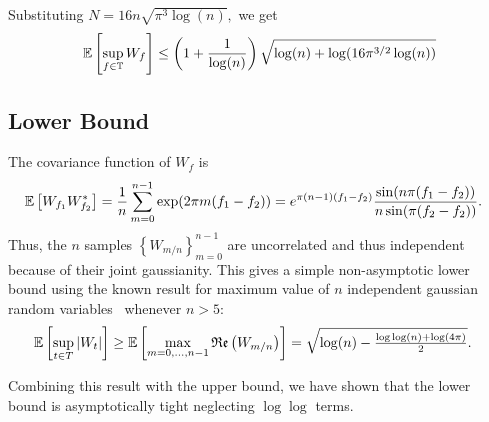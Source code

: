 Substituting $N = 16 n \sqrt{\pi^3 \log(n)},$ we get
\[
	\operatorname{\mathbb{E}}\left[\sup_{f \in \mathbb{T}} W_f \right] \leq \left( 1 + \frac{1}{\log(n)} \right)\sqrt{\log(n) + \log(16 \pi^{3/2} \log(n))}
\]
\subsection{Lower Bound}

The covariance function of $W_f$ is
\begin{align*}
\operatorname{\mathbb{E}}\left[W_{f_1} W_{f_2}^*\right] &= \frac{1}{n}\sum_{m=0}^{n-1} \exp(2\pi m (f_1 - f_2)) = e^{\pi (n - 1) (f_1-f_2)} \frac{\sin(n \pi (f_1 - f_2) ) }{ n \sin(\pi (f_2 - f_2))}.
\end{align*}
Thus, the $n$ samples $\left\{W_{m/n}\right\}_{m=0}^{n-1}$ are uncorrelated and thus independent because of their joint gaussianity. This gives a simple non-asymptotic lower bound using the known result for maximum value of $n$ independent gaussian random variables~\cite{lr76} whenever $n > 5$:
\begin{align*}
\operatorname{\mathbb{E}}\left[\sup_{t \in T} \left| W_t \right| \right] &\geq \operatorname{\mathbb{E}}\left[\max_{m = 0, \ldots, n-1} \mathop{\mathfrak{Re}}\left( W_{m/n} \right)  \right] = \sqrt{\log(n) - \tfrac{ \log\log(n) + \log(4\pi)}{2}}.
\end{align*}

Combining this result with the upper bound, we have shown that the lower bound is asymptotically tight neglecting $\log\log$ terms.

